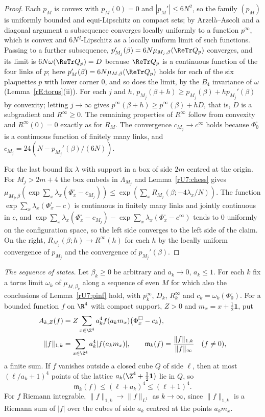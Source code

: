 \begin{proof}
Each $p_M$ is convex with $p_M(0)=0$ and $|p_M'|\le6N^2$, so the family
$(p_{M})$ is uniformly bounded and equi-Lipschitz on compact sets; by
Arzel\`a--Ascoli and a diagonal argument a subsequence converges locally
uniformly to a function $p^\infty$, which is convex and $6N^2$-Lipschitz as a
locally uniform limit of such functions. Passing to a further subsequence,
$p_{M_j}'(\beta)=6N\mu_{M_j,\beta}(\ReTr Q_p)$ converges, and its limit is
$6N\omega(\ReTr Q_p)=D$ because $\ReTr Q_p$ is a continuous function of the four
links of $p$; here $p_{M}'(\beta)=6N\mu_{M,\beta}(\ReTr Q_p)$ holds for each of
the six plaquettes $p$ with lower corner $0$, and so does the limit, by
the $B_4$ invariance of $\omega$ (Lemma~\ref{rE:torus}(ii)). For each $j$ and $h$, $p_{M_j}(\beta+h)\ge p_{M_j}(\beta)+hp_{M_j}'(
\beta)$ by convexity; letting $j\to\infty$ gives $p^\infty(\beta+h)\ge
p^\infty(\beta)+hD$, that is, $D$ is a subgradient and $R^\infty\ge0$. The
remaining properties of $R^\infty$ follow from convexity and $R^\infty(0)=0$
exactly as for $R_M$. The convergence $c_{M_j}\to c^\infty$ holds because
$\Phi^\square_0$ is a continuous function of finitely many links, and
$c_{M_j}=24(N-p_{M_j}'(\beta)/(6N))$.

For the last bound fix $\lambda$ with support in a box of side $2m$ centred at
the origin. For $M_j>2m+4$ the box embeds in $\Lambda_{M_j}$ and
Lemma~\ref{rU7:chess} gives $\mu_{M_j,\beta}(\exp\sum_x\lambda_x(\Phi^\square
_x-c_{M_j}))\le\exp(\sum_xR_{M_j}(\beta;-4\lambda_x/N))$. The function
$\exp\sum_x\lambda_x(\Phi^\square_x-c)$ is continuous in finitely many links
and jointly continuous in $c$, and $\exp\sum_x\lambda_x(\Phi^\square_x-c_{M_j})
-\exp\sum_x\lambda_x(\Phi^\square_x-c^\infty)$ tends to $0$ uniformly on the
configuration space, so the left side converges to the left side of the claim.
On the right, $R_{M_j}(\beta;h)\to R^\infty(h)$ for each $h$ by the locally
uniform convergence of $p_{M_j}$ and the convergence of $p_{M_j}'(\beta)$.
\end{proof}

\emph{The sequence of states.} Let $\beta_k\ge0$ be arbitrary and
$a_k\to0$, $a_k\le1$. For each $k$ fix a torus limit $\omega_k$ of
$\mu_{M,\beta_k}$ along a sequence of even $M$ for which also the conclusions
of Lemma~\ref{rU7:pinf} hold, with $p_k^\infty$, $D_k$, $R_k^\infty$ and
$c_k=\omega_k(\Phi^\square_0)$. For a bounded function $f$ on $\R^4$ with
compact support, $Z>0$ and $m_x=x+\frac12\mathbf1$, put
\begin{align*}
A_{k,Z}(f)&=Z\sum_{x\in\Z^4}a_k^4f(a_km_x)\bigl(\Phi^\square_x-c_k\bigr),\\
\|f\|_{1,k}&=\sum_{x\in\Z^4}a_k^4|f(a_km_x)| ,\qquad
\mathfrak m_k(f)=\frac{\|f\|_{1,k}}{\|f\|_\infty}\quad(f\ne0),
\end{align*}
a finite sum. If $f$ vanishes outside a closed cube $Q$ of side $\ell$, then
at most $(\ell/a_k+1)^4$ points of the lattice $a_k(\Z^4+\frac12\mathbf1)$
lie in $Q$, so
\[
\mathfrak m_k(f)\le(\ell+a_k)^4\le(\ell+1)^4 .
\tag{rU7.3}\label{rU7:count}
\]
For $f$ Riemann integrable, $\|f\|_{1,k}\to\|f\|_{L^1}$ as $k\to\infty$,
since $\|f\|_{1,k}$ is a Riemann sum of $|f|$ over the cubes of side $a_k$
centred at the points $a_km_x$.

